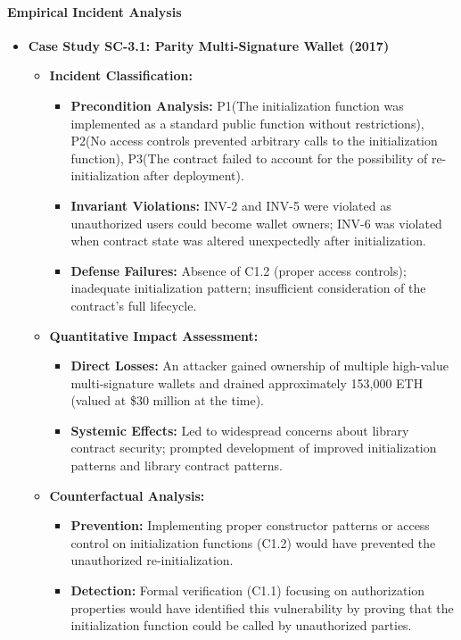 \paragraph{Empirical Incident Analysis}

\begin{itemize}
\item \textbf{Case Study SC-3.1: Parity Multi-Signature Wallet (2017)}
    \begin{itemize}
    \item \textbf{Incident Classification:}
        \begin{itemize}
        \item \textbf{Precondition Analysis:} P1\checkmark (The initialization function was implemented as a standard public function without restrictions), P2\checkmark (No access controls prevented arbitrary calls to the initialization function), P3\checkmark (The contract failed to account for the possibility of re-initialization after deployment).
        \item \textbf{Invariant Violations:} INV-2 and INV-5 were violated as unauthorized users could become wallet owners; INV-6 was violated when contract state was altered unexpectedly after initialization.
        \item \textbf{Defense Failures:} Absence of C1.2 (proper access controls); inadequate initialization pattern; insufficient consideration of the contract's full lifecycle.
        \end{itemize}
    
    \item \textbf{Quantitative Impact Assessment:}
        \begin{itemize}
        \item \textbf{Direct Losses:} An attacker gained ownership of multiple high-value multi-signature wallets and drained approximately 153,000 ETH (valued at \$30 million at the time).
        \item \textbf{Systemic Effects:} Led to widespread concerns about library contract security; prompted development of improved initialization patterns and library contract patterns.
        \end{itemize}
    
    \item \textbf{Counterfactual Analysis:}
        \begin{itemize}
        \item \textbf{Prevention:} Implementing proper constructor patterns or access control on initialization functions (C1.2) would have prevented the unauthorized re-initialization.
        \item \textbf{Detection:} Formal verification (C1.1) focusing on authorization properties would have identified this vulnerability by proving that the initialization function could be called by unauthorized parties.
        \end{itemize}
    \end{itemize}
\end{itemize}

